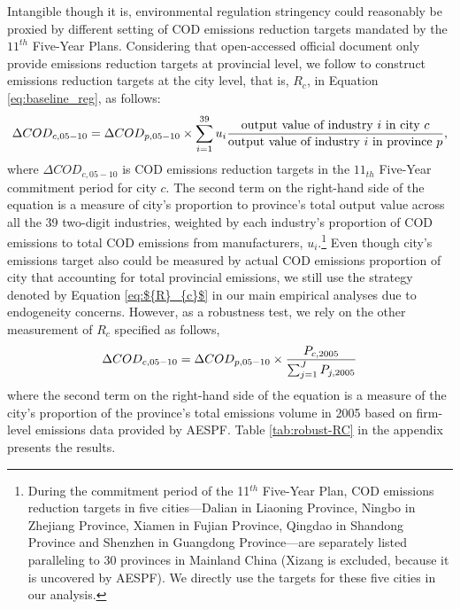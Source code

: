 \documentclass[12pt,english]{article}
\begin{document}
Intangible though it is, environmental regulation stringency could reasonably be proxied by different setting of COD emissions reduction targets mandated by the $11^{th}$ Five-Year Plans. Considering that open-accessed official document only provide emissions reduction targets at provincial level, we follow \citet*{chen2018consequences} to construct emissions reduction targets at the city level, that is, ${R}_{c}$, in Equation \ref{eq:baseline_reg}, as follows:
\begin{equation} \label{eq:${R}_{c}$}
\Delta COD_{c,05-10}=\Delta COD_{p,05-10} \times\sum_{i=1}^{39} u_{i}\dfrac{\text{output value of industry $i$ in city $c$}}{\text{output value of industry $i$ in province $p$}},
\end{equation}
where $ \Delta COD_{c,05-10} $ is COD emissions reduction targets in the $11_{th}$ Five-Year commitment period for city $c$. The second term on the right-hand side of the equation is a measure of city's proportion to province's total output value across all the 39 two-digit industries, weighted by each industry’s proportion of COD emissions to total COD emissions from manufacturers, $u_{i}$.\footnote{During the commitment period of the 11$^{th}$ Five-Year Plan, COD emissions reduction targets in five cities---Dalian in Liaoning Province, Ningbo in Zhejiang Province, Xiamen in Fujian Province, Qingdao in Shandong Province and Shenzhen in Guangdong Province---are separately listed paralleling to 30 provinces in Mainland China (Xizang is excluded, because it is uncovered by AESPF). We directly use the targets for these five cities in our analysis.} Even though city's emissions target also could be measured by actual COD emissions proportion of city that accounting for total provincial emissions, we still use the strategy denoted by Equation \ref{eq:${R}_{c}$} in our main empirical analyses due to endogeneity concerns. However, as a robustness test, we rely on the other measurement of ${R}_{c}$ specified as follows,
	\begin{equation} \label{eq:${R}_{c}$ alternative measurement}
	\Delta COD_{c,05-10}=\Delta COD_{p,05-10} \times\dfrac{P_{c,2005}}{\sum_{j=1}^{J}P_{j,2005}}
	\end{equation}
where the second term on the right-hand side of the equation is a measure of the city's proportion of the province's total emissions volume in 2005 based on firm-level emissions data provided by AESPF. Table \ref{tab:robust-RC} in the appendix presents the results.
\end{document}
